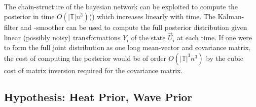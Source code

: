 The chain-structure of the bayesian network can be exploited to compute the posterior in time $O(|\mathbb{T}|n^3)$(\cite{probnum}) which increases linearly with time. The Kalman-filter and -smoother can be used to compute the full posterior distribution given linear (possibly noisy) transformations $Y_i$ of the state $\vec{U}_i$ at each time.
If one were to form the full joint distribution as one long mean-vector and covariance matrix, the cost of computing the posterior would be of order $O(|\mathbb{T}|^3n^3)$ by the cubic cost of matrix inversion required for the covariance matrix.




\subsection*{Hypothesis: Heat Prior, Wave Prior}



\ifdefined\COMPILINGFROMMAIN
\else    
    
\fi